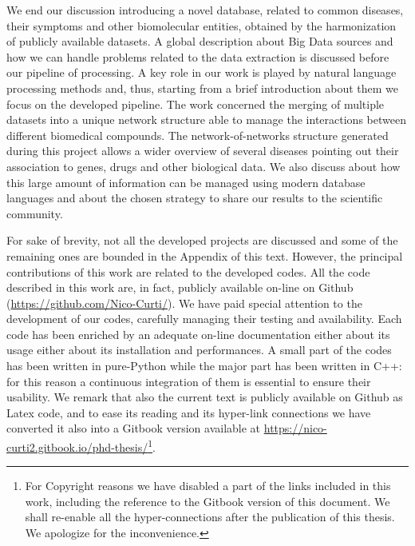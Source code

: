 \documentclass{standalone}
\begin{document}
We end our discussion introducing a novel database, related to common diseases, their symptoms and other biomolecular entities, obtained by the harmonization of publicly available datasets.
A global description about Big Data sources and how we can handle problems related to the data extraction is discussed before our pipeline of processing.
A key role in our work is played by natural language processing methods and, thus, starting from a brief introduction about them we focus on the developed pipeline.
The work concerned the merging of multiple datasets into a unique network structure able to manage the interactions between different biomedical compounds.
The network-of-networks structure generated during this project allows a wider overview of several diseases pointing out their association to genes, drugs and other biological data.
We also discuss about how this large amount of information can be managed using modern database languages and about the chosen strategy to share our results to the scientific community.

For sake of brevity, not all the developed projects are discussed and some of the remaining ones are bounded in the Appendix of this text.
However, the principal contributions of this work are related to the developed codes.
All the code described in this work are, in fact, publicly available on-line on Github (\url{https://github.com/Nico-Curti/}).
We have paid special attention to the development of our codes, carefully managing their testing and availability.
Each code has been enriched by an adequate on-line documentation either about its usage either about its installation and performances.
A small part of the codes has been written in pure-\textsf{Python} while the major part has been written in \textsf{C++}: for this reason a continuous integration of them is essential to ensure their usability.
We remark that also the current text is publicly available on Github as \textsf{Latex} code, and to ease its reading and its hyper-link connections we have converted it also into a \textsf{Gitbook} version available at \url{https://nico-curti2.gitbook.io/phd-thesis/}\footnote{
  For Copyright reasons we have disabled a part of the links included in this work, including the reference to the \textsf{Gitbook} version of this document.
  We shall re-enable all the hyper-connections after the publication of this thesis.
  We apologize for the inconvenience.
}.



\end{document}
